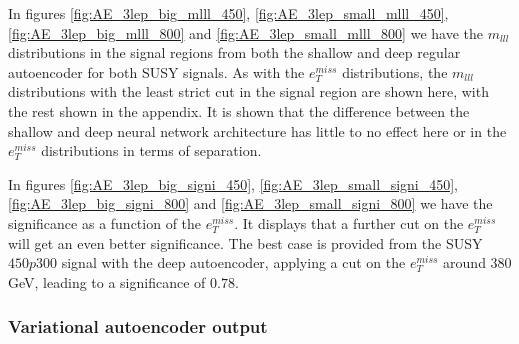 In figures \ref{fig:AE_3lep_big_mlll_450}, \ref{fig:AE_3lep_small_mlll_450}, \ref{fig:AE_3lep_big_mlll_800} and  
\ref{fig:AE_3lep_small_mlll_800} we have the  $m_{lll}$ distributions in the signal 
regions from both the shallow and deep regular 
autoencoder for both SUSY signals. As with the $e_T^{miss}$ distributions, the $m_{lll}$ distributions 
with the least strict cut in the signal region are shown here, with the rest shown in the appendix. 
It is shown that the difference between the shallow and deep neural network architecture has little to no effect 
here or in the $e_T^{miss}$ distributions in terms of separation. \par 
In figures \ref{fig:AE_3lep_big_signi_450}, \ref{fig:AE_3lep_small_signi_450}, \ref{fig:AE_3lep_big_signi_800} and  
\ref{fig:AE_3lep_small_signi_800} we have the significance as a function of the $e_T^{miss}$. It displays that 
a further cut on the $e_T^{miss}$ will get an even better significance. The best case is provided from the SUSY $450p300$
signal with the deep autoencoder, applying a cut on the $e_T^{miss}$ around 380 GeV, leading to a significance of $0.78$. 


\subsubsection*{Variational autoencoder output}


